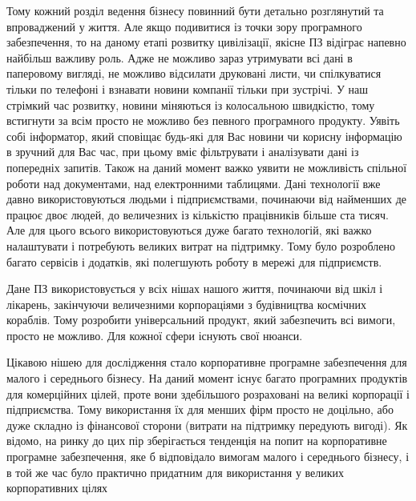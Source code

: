 Тому кожний розділ ведення бізнесу повинний бути детально розглянутий та впроваджений у життя. 
Але якщо подивитися із точки зору програмного забезпечення, то на даному етапі розвитку цивілізації, якісне ПЗ відіграє напевно найбільш важливу роль. 
Адже не можливо зараз утримувати всі дані в паперовому вигляді, не можливо відсилати друковані листи, чи спілкуватися тільки по телефоні і взнавати новини компанії тільки при зустрічі. 
У наш стрімкий час розвитку, новини міняються із колосальною швидкістю, тому встигнути за всім просто не можливо без певного програмного продукту. 
Уявіть собі інформатор, який сповіщає будь-які для Вас новини чи корисну інформацію в зручний для Вас час, при цьому вміє фільтрувати і аналізувати дані із попередніх запитів. 
Також на даний момент важко уявити не можливість спільної роботи над документами, над електронними таблицями. 
Дані технології вже давно використовуються людьми і підприємствами, починаючи від найменших де працює двоє людей, до величезних із кількістю працівників більше ста тисяч. 
Але для цього всього використовуються дуже багато технологій, які важко налаштувати і потребують великих витрат на підтримку.
Тому було розроблено багато сервісів і додатків, які полегшують роботу в мережі для підприємств.
\par Дане ПЗ використовується у всіх нішах нашого життя, починаючи від шкіл і лікарень, закінчуючи величезними корпораціями з будівництва космічних кораблів. 
Тому розробити універсальний продукт, який забезпечить всі вимоги, просто не можливо. 
Для кожної сфери існують свої нюанси.
\par Цікавою нішею для дослідження стало корпоративне програмне забезпечення для малого і середнього бізнесу.
 На даний момент існує багато програмних продуктів для комерційних цілей, проте вони здебільшого розраховані на великі корпорації і підприємства.
Тому використання їх для менших фірм просто не доцільно, або дуже складно із фінансової сторони (витрати на підтримку передують вигоді).
Як відомо, на ринку до цих пір зберігається тенденція на попит на корпоративне програмне забезпечення, яке б відповідало вимогам малого і середнього бізнесу, і в той же час було практично придатним для використання у великих корпоративних цілях

